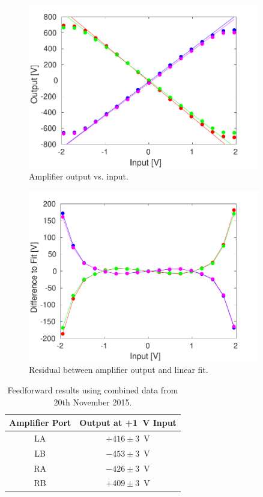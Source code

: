 \begin{figure}
  \centering
  \includegraphics[width=0.9\textwidth]{Figures/commissioning/AmpOutvsDAC}
  \caption{Amplifier output vs. input.}
  \label{f:AmpOutvsDAC}
\end{figure}

\begin{figure}
  \centering
  \includegraphics[width=0.9\textwidth]{Figures/commissioning/AmpOutvsDAC_residual}
  \caption{Residual between amplifier output and linear fit.}
  \label{f:AmpOutvsDAC_residual}
\end{figure}

\begin{table}
  \begin{center}
    \begin{tabular}{| c | c |}
	   \hline
       Amplifier Port & Output at +1~V Input \\ \hline
       LA & \(+416\pm3\)~V \\
	   LB & \(-453\pm3\)~V \\
	   RA & \(-426\pm3\)~V \\
	   RB & \(+409\pm3\)~V \\
 	   \hline
    \end{tabular}
    \caption{Feedforward results using combined data from 20th November 2015.}
  	\label{t:AmpOutVsDAC}
  \end{center}
\end{table}

